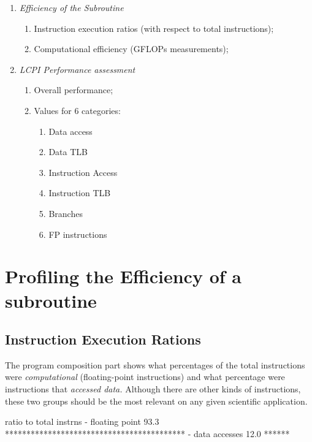 \begin{enumerate}
  \item  \emph{Efficiency of the Subroutine}
  \begin{enumerate}
    \item \emph{ }Instruction execution ratios (with respect to total instructions);
    \item  Computational efficiency (GFLOPs measurements);
  \end{enumerate}
  \item  \emph{LCPI Performance assessment}
  \begin{enumerate}
    \item \emph{ }Overall performance;
    \item  Values for 6 categories:
    \begin{enumerate}
      \item  Data access
      \item  Data TLB
      \item  Instruction Access
      \item  Instruction TLB
      \item  Branches
      \item  FP instructions
    \end{enumerate}
  \end{enumerate}
\end{enumerate}

\section{Profiling the Efficiency of a subroutine}
\label{sec:Profiling_Efficiency_of_a_subroutine}

\subsection{Instruction Execution Rations}
\label{subsec:Instruction_Execution_Ratios}

The program composition part shows what percentages of the total instructions were \emph{computational} (floating-point instructions) and what percentage were instructions that \emph{accessed data.} Although there are other kinds of instructions, these two groups should be the most relevant on any given scientific application.

\begin{prompt}
ratio to total instrns     %
- floating point       93.3 ******************************************
- data accesses        12.0 ******
\end{prompt}

